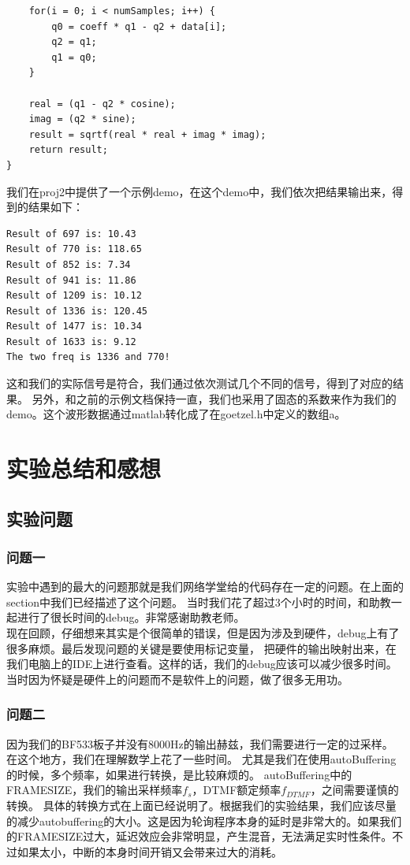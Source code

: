 \documentclass{article}
\begin{document}
\begin{CJK}{UTF8}{gbsn}
\begin{lstlisting}
    for(i = 0; i < numSamples; i++) {
        q0 = coeff * q1 - q2 + data[i];
        q2 = q1;
        q1 = q0;
    }

    real = (q1 - q2 * cosine);
    imag = (q2 * sine);
    result = sqrtf(real * real + imag * imag);
    return result;
}
\end{lstlisting}
我们在proj2中提供了一个示例demo，在这个demo中，我们依次把结果输出来，得到的结果如下：
\begin{lstlisting}
Result of 697 is: 10.43
Result of 770 is: 118.65
Result of 852 is: 7.34
Result of 941 is: 11.86
Result of 1209 is: 10.12
Result of 1336 is: 120.45
Result of 1477 is: 10.34
Result of 1633 is: 9.12
The two freq is 1336 and 770!
\end{lstlisting}
这和我们的实际信号是符合，我们通过依次测试几个不同的信号，得到了对应的结果。
另外，和之前的示例文档保持一直，我们也采用了固态的系数来作为我们的demo。这个波形数据通过matlab转化成了在goetzel.h中定义的数组a。
\section{实验总结和感想}
\subsection{实验问题}
\subsubsection{问题一}
实验中遇到的最大的问题那就是我们网络学堂给的代码存在一定的问题。在上面的section中我们已经描述了这个问题。
当时我们花了超过3个小时的时间，和助教一起进行了很长时间的debug。非常感谢助教老师。\\
现在回顾，仔细想来其实是个很简单的错误，但是因为涉及到硬件，debug上有了很多麻烦。最后发现问题的关键是要使用标记变量，
把硬件的输出映射出来，在我们电脑上的IDE上进行查看。这样的话，我们的debug应该可以减少很多时间。\\
当时因为怀疑是硬件上的问题而不是软件上的问题，做了很多无用功。
\subsubsection{问题二}
因为我们的BF533板子并没有8000Hz的输出赫兹，我们需要进行一定的过采样。在这个地方，我们在理解数学上花了一些时间。
尤其是我们在使用autoBuffering的时候，多个频率，如果进行转换，是比较麻烦的。
autoBuffering中的FRAMESIZE，我们的输出采样频率\(f_s\)，DTMF额定频率\(f_{DTMF}\)，之间需要谨慎的转换。
具体的转换方式在上面已经说明了。根据我们的实验结果，我们应该尽量的减少autobuffering的大小。这是因为轮询程序本身的延时是非常大的。如果我们的FRAMESIZE过大，延迟效应会非常明显，产生混音，无法满足实时性条件。不过如果太小，中断的本身时间开销又会带来过大的消耗。

\end{CJK}
\end{document}
